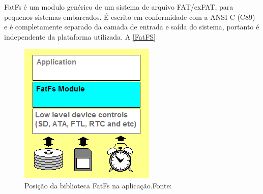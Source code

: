 FatFs é um modulo genérico de um sistema de arquivo FAT/exFAT, para pequenos sistemas embarcados. É escrito em conformidade com a ANSI C (C89) e é completamente separado da camada de entrada e saída do sistema, portanto é independente da plataforma utilizada. A \autoref{FatFS}


\begin{figure}[H]
    \scriptsize
     \centering
     \includegraphics[scale=1]{dados/figuras/fatfs.png}
     \caption{Posição da biblioteca FatFs na aplicação.\newline  Fonte:\cite{FATFS}}
     \label{FatFS}
\end{figure}



